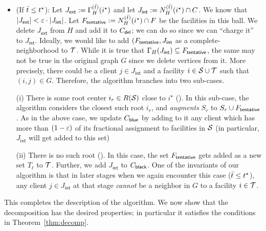 \begin{itemize}
\item (If $\bar{t} \leq t^\star$): Let $J_\mathsf{ext} := \Gamma_H^{(\bar{t})}(i^\star)$ and let $J_\mathsf{int} := N_H^{(\bar{t})}(i^\star) \cap C$. We know that $|J_\mathsf{ext}| < \varepsilon\cdot |J_\mathsf{int}|$. 
Let $F_\mathsf{tentative} := N_H^{(\bar{t})}(i^\star) \cap F$ be the facilities in this ball. We delete $J_\mathsf{ext}$ from $H$ and add it to $C_{\mathsf{del}}$; we can do so since we can ``charge it'' to $J_\mathsf{int}$.
Ideally, we would like to add $(F_\mathsf{tentative},J_\mathsf{int}$ as a complete-neighborhood to ${\cal T}$.
While it is true that $\Gamma_H(J_\mathsf{int}) \subseteq F_\mathsf{tentative}$, the same may not be true in the original graph $G$ since we delete vertices from it. More precisely, there could be a client $j\in J_\mathsf{int}$ and a facility $i\in {\cal S}\cup{\cal T}$
such that $(i,j) \in G$. Therefore, the algorithm branches into two sub-cases.
%
%

(i) There is some root center  $i_r \in R({\cal S})$ close to $i^\star$ (). In  this
    sub-case, the algorithm considers the closest such root $i_r$, and {\em augments} $S_r$ to $S_r \cup F_\mathsf{tentative}$. As in the above case,
    we update $C_{\mathsf{blue}}$ by adding to it any client which has more than $(1-\varepsilon)$ of its fractional assignment to facilities in ${\cal S}$ (in particular, $J_\mathsf{int}$ will
    get added to this set) 
    
 (ii) There is no such root ().  In this case, the set $F_\mathsf{tentative}$ gets added as a new set $T_\ell$ to ${\cal T}$. Further,
    we add $J_\mathsf{int}$ to $C_{\mathsf{black}}$. One of the invariants of our algorithm is that in later stages when we again encounter this case ($\bar{t} \leq t^\star$), any client $j\in J_\mathsf{int}$ at that stage {\em cannot} be a neighbor in $G$ to a facility $i\in {\cal T}$.
    \end{itemize}

This completes the description of the algorithm. We now show that the decomposition has the desired properties; in particular it satisfies the conditions in Theorem~\ref{thm:decomp}.

